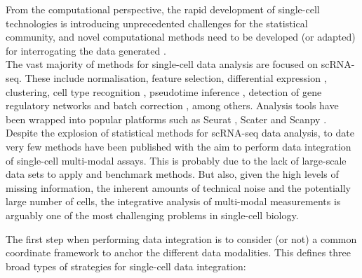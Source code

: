 From the computational perspective, the rapid development of single-cell technologies is introducing unprecedented challenges for the statistical community, and novel computational methods need to be developed (or adapted) for interrogating the data generated \cite{Stegle2015}.\\
The vast majority of methods for single-cell data analysis are focused on scRNA-seq. These include normalisation\cite{Lun2018}, feature selection\cite{Townes2019}, differential expression \cite{Kharchenko2014}, clustering\cite{Kiselev2017}, cell type recognition \cite{Abdelaal2019}, pseudotime inference \cite{Haghverdi2016}, detection of gene regulatory networks and batch correction \cite{Haghverdi2018}, among others. Analysis tools have been wrapped into popular platforms such as Seurat \cite{Butler2018}, Scater \cite{McCarthy2017} and Scanpy \cite{Wolf2018}.\\
Despite the explosion of statistical methods for scRNA-seq data analysis, to date very few methods have been published  with the aim to perform data integration of single-cell multi-modal assays. This is probably due to the lack of large-scale data sets to apply and benchmark methods. But also, given the high levels of missing information, the inherent amounts of technical noise and the potentially large number of cells, the integrative analysis of multi-modal measurements is arguably one of the most challenging problems in single-cell biology.

The first step when performing data integration is to consider (or not) a common coordinate framework to anchor the different data modalities. This defines three broad types of strategies for single-cell data integration: 

